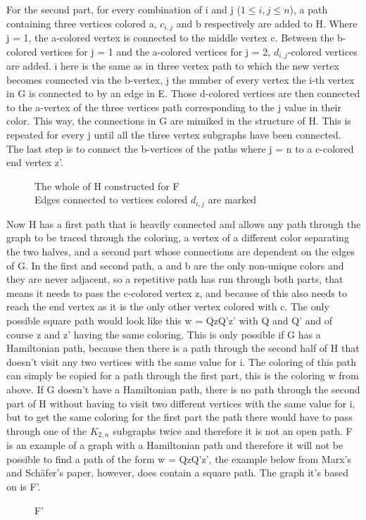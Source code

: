 \documentclass[12pt,a4paper]{article}
\begin{document}
\newline
 For the second part, for every combination of i and j ($1 \leq i, j \leq n$), a path containing three vertices colored a, $c_{i,j}$ and b respectively are added to H. Where j = 1, the a-colored vertex is connected to the middle vertex c. Between the b-colored vertices for j = 1 and the a-colored vertices for j = 2, $d_{i,j}$-colored vertices are added. i here is the same as in three vertex path to which the new vertex becomes connected via the b-vertex, j the number of every vertex the i-th vertex in G is connected to by an edge in E. Those d-colored vertices are then connected to the a-vertex of the three vertices path corresponding to the j value in their color. This way, the connections in G are mimiked in the structure of H. This is repeated for every j until all the three vertex subgraphs have been connected. The last step is to connect the b-vertices of the paths where j = n to a c-colored end vertex z'. 
\begin{figure}[h]
	
	\caption{The whole of H constructed for F \\ Edges connected to vertices colored $d_{i,j}$ are marked}
\end{figure}
\newpage
Now H has a first path that is heavily connected and allows any path through the graph to be traced through the coloring, a vertex of a different color separating the two halves, and a second part whose connections are dependent on the edges of G. In the first and second path, a and b are the only non-unique colors and they are never adjacent, so a repetitive path has run through both parts, that means it needs to pass the c-colored vertex z, and because of this also needs to reach the end vertex as it is the only other vertex colored with c. The only possible square path would look like this w = QzQ'z' with Q and Q' and of course z and z' having the same coloring. This is only possible if G has a Hamiltonian path, because then there is a path through the second half of H that doesn't visit any two vertices with the same value for i. The coloring of this path can simply be copied for a path through the first part, this is the coloring w from above. If G doesn't have a Hamiltonian path, there is no path through the second part of H without having to visit two different vertices with the same value for i, but to get the same coloring for the first part the path there would have to pass through one of the $K_{2,n}$ subgraphs twice and therefore it is not an open path. F is an example of a graph with a Hamiltonian path and therefore it will not be possible to find a path of the form w = QzQ'z', the example below from Marx's and Schäfer's paper, however, does contain a square path. The graph it's based on is F'.
\begin{figure}[h]
	
	\caption{F'}
\end{figure}
\end{document}
